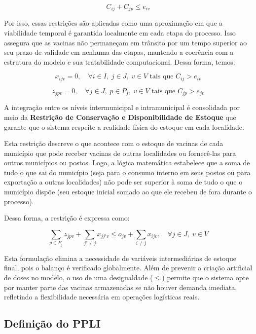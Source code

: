 \[
C_{ij} + C_{jp} \le e_{iv}
\]

Por isso, essas restrições são aplicadas como uma aproximação em que a viabilidade temporal é garantida localmente em cada etapa do processo. Isso assegura que as vacinas não permaneçam em trânsito por um tempo superior ao seu prazo de validade em nenhuma das etapas, mantendo a coerência com a estrutura do modelo e sua tratabilidade computacional. Dessa forma, temos:

\begin{equation*}
x_{ijv} = 0, \quad \forall i \in I, \; j \in J, \; v \in V \text{ tais que } C_{ij} > e_{iv}
\end{equation*}

\begin{equation*}
z_{jpv} = 0, \quad \forall j \in J, \; p \in P_j, \; v \in V \text{ tais que } C_{jp} > e_{jv}
\end{equation*}

A integração entre os níveis intermunicipal e intramunicipal é consolidada por meio da \textbf{Restrição de Conservação e Disponibilidade de Estoque} que garante que o sistema respeite a realidade física do estoque em cada localidade.

Esta restrição descreve o que acontece com o estoque de vacinas de cada município que pode receber vacinas de outras localidades ou fornecê-las para outros municípios ou postos. Logo, a lógica matemática estabelece que a soma de tudo o que sai do município (seja para o consumo interno em seus postos ou para exportação a outras localidades) não pode ser superior à soma de tudo o que o município dispõe (seu estoque inicial somado ao que ele recebeu de fora durante o processo). 

Dessa forma, a restrição é expressa como:

\begin{equation*}
\sum_{p \in P_j} z_{jpv} + \sum_{j' \neq j} x_{jj'v} \le o_{jv} + \sum_{i \neq j} x_{ijv}, \quad \forall j \in J, \; v \in V
\end{equation*}

Esta formulação elimina a necessidade de variáveis intermediárias de estoque final, pois o balanço é verificado globalmente. Além de prevenir a criação artificial de doses no modelo, o uso de uma desigualdade ($\le$) permite que o sistema opte por manter parte das vacinas armazenadas se não houver demanda imediata, refletindo a flexibilidade necessária em operações logísticas reais.


\subsection{Definição do PPLI}

